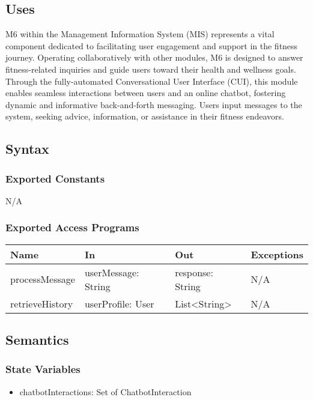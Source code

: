 \documentclass[12pt, titlepage]{article}
\begin{document}
\subsection{Uses}
M6 within the Management Information System (MIS) represents a vital component dedicated to facilitating user engagement and support in the fitness journey. Operating collaboratively with other modules, M6 is designed to answer fitness-related inquiries and guide users toward their health and wellness goals. Through the fully-automated Conversational User Interface (CUI), this module enables seamless interactions between users and an online chatbot, fostering dynamic and informative back-and-forth messaging. Users input messages to the system, seeking advice, information, or assistance in their fitness endeavors.

\subsection{Syntax}

\subsubsection{Exported Constants}
N/A

\subsubsection{Exported Access Programs}

\begin{center}
\begin{tabular}{l l l l}
\hline
\textbf{Name} & \textbf{In} & \textbf{Out} & \textbf{Exceptions} \\
\hline
processMessage & userMessage: String & response: String  & N/A \\
retrieveHistory & userProfile: User & List\textless String\textgreater   & N/A \\
\hline
\end{tabular}
\end{center}

\subsection{Semantics}

\subsubsection{State Variables}
\begin{itemize}
\item chatbotInteractions: Set of ChatbotInteraction
\end{itemize}
\end{document}
